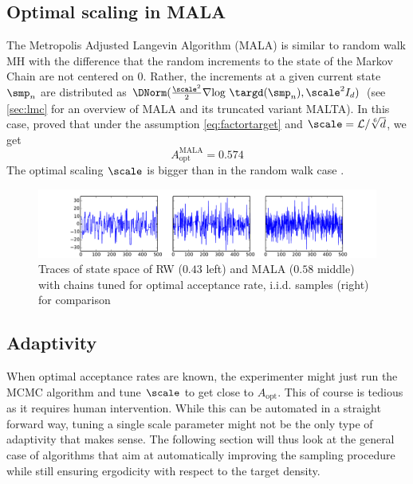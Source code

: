 \subsection{Optimal scaling in MALA}
The Metropolis Adjusted Langevin Algorithm (MALA) \cite{Roberts1996} is similar to random walk MH with the difference that the random increments to the state of the Markov Chain are not centered on $0$. Rather, the increments at a given current state $\smp_n$ are distributed as $\DNorm(\frac{\scale^2}{2}\nabla \textrm{log}~\targd(\smp_n),\scale^2I_d)$ (see \ref{sec:lmc} for an overview of MALA and its truncated variant MALTA). In this case, \cite{Roberts1998} proved that under the assumption \eqref{eq:factortarget} and $\scale = \sfact/\sqrt[6]{d}$, we get 
 $$A^\textrm{MALA}_\textrm{opt} =  0.574$$
 The optimal scaling $\scale$ is bigger than in the random walk case . 
 \begin{figure}[htbp]
\begin{center}
\includegraphics[width=\textwidth]{Figures/RW_vs_MALA_vs_iid.pdf}
\caption{Traces of state space of RW ($0.43$ left) and MALA ($0.58$ middle) with chains tuned for optimal acceptance rate, i.i.d. samples (right) for comparison}
\label{fig:rw_vs_mala}
\end{center}
\end{figure}

\subsection{Adaptivity}
When optimal acceptance rates are known, the experimenter might just run the MCMC algorithm and tune $\scale$ to get close to $A_\textrm{opt}$. This of course is tedious as it requires human intervention. While this can be automated in a straight forward way, tuning a single scale parameter might not be the only type of adaptivity that makes sense. The following section will thus look at the general case of algorithms that aim at automatically improving the sampling procedure while still ensuring ergodicity with respect to the target density.

